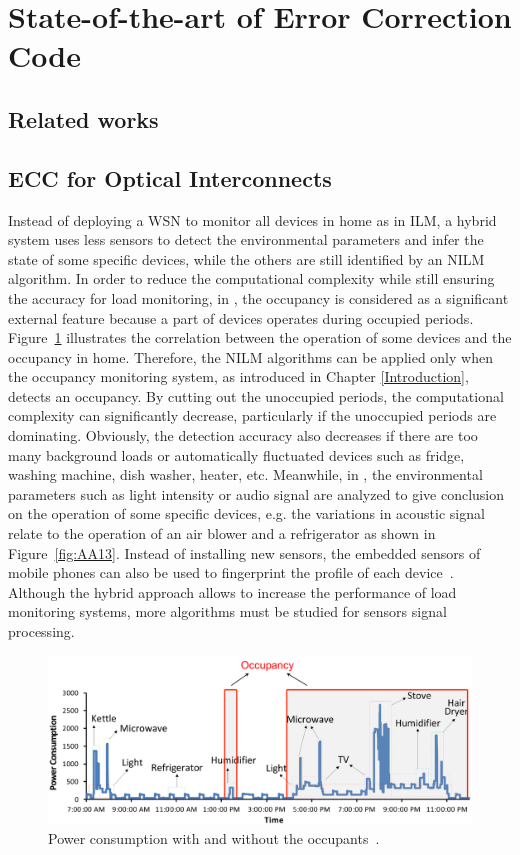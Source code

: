 \section{State-of-the-art of Error Correction Code}
\subsection{Related works}
\subsection{ECC for Optical Interconnects}

Instead of deploying a WSN to monitor all devices in home as in ILM, a hybrid system uses less sensors to detect the environmental parameters and infer the state of some specific devices, while the others are still identified by an NILM algorithm. 
In order to reduce the computational complexity while still ensuring the accuracy for load monitoring, in \cite{TangW16}, the occupancy is considered as a significant external feature because a part of devices operates during occupied periods. Figure~\ref{fig:A13} illustrates the correlation between the operation of some devices and the occupancy in home. Therefore, the NILM algorithms can be applied only when the occupancy monitoring system, as introduced in Chapter \ref{Introduction}, detects an occupancy. By cutting out the unoccupied periods, the computational complexity can significantly decrease, particularly if the unoccupied periods are dominating. Obviously, the detection accuracy also decreases if there are too many background loads or automatically fluctuated devices such as fridge, washing machine, dish washer, heater, etc. Meanwhile, in \cite{Berges10,Berges11,Guvensan13}, the environmental parameters such as light intensity or audio signal are analyzed to give conclusion on the operation of some specific devices, e.g. the variations in acoustic signal relate to the operation of an air blower and a refrigerator as shown in Figure~\ref{fig:AA13}. Instead of installing new sensors, the embedded sensors of mobile phones can also be used to fingerprint the profile of each device~\cite{Uddin12}. Although the hybrid approach allows to increase the performance of load monitoring systems, more algorithms must be studied for sensors signal processing.

\begin{figure}[!ht]
\centering
\includegraphics[width=1\textwidth]{./chapters/chapter2/images/occupancy_states.pdf} 
\caption{Power consumption with and without the occupants~\cite{TangW16}.} 
\label{fig:A13} 
\end{figure}


